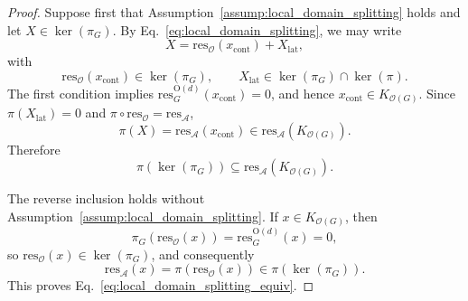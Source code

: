 \documentclass[aps,prx,reprint,superscriptaddress,twocolumn,amsmath,amssymb,amsfonts, nofootinbib]{revtex4-2}
\newcommand{\res}{\text{res}}
\theoremstyle{apsstyle}
\begin{document}
\begin{proof}
Suppose first that Assumption~\ref{assump:local_domain_splitting} holds and let
$X\in\ker(\pi_G)$. By Eq.~\ref{eq:local_domain_splitting}, we may write
\begin{equation*}
    X=\res_{\mathcal O}(x_{\mathrm{cont}})+X_{\mathrm{lat}},
\end{equation*}
with
\begin{equation*}
    \res_{\mathcal O}(x_{\mathrm{cont}})\in\ker(\pi_G),
    \qquad
    X_{\mathrm{lat}}\in\ker(\pi_G)\cap\ker(\pi).
\end{equation*}
The first condition implies $\res_G^{\mathrm{O}(d)}(x_{\mathrm{cont}})=0$, and hence $x_{\mathrm{cont}}\in K_{\mathcal O(G)}$. Since
$\pi(X_{\mathrm{lat}})=0$ and
$\pi\circ\res_{\mathcal O}=\res_{\mathcal A}$,
\begin{equation*}
    \pi(X)
    =
    \res_{\mathcal A}(x_{\mathrm{cont}})
    \in
    \res_{\mathcal A}(K_{\mathcal O(G)}).
\end{equation*}
Therefore
\begin{equation*}
    \pi(\ker(\pi_G))
    \subseteq
    \res_{\mathcal A}(K_{\mathcal O(G)}).
\end{equation*}

The reverse inclusion holds without Assumption~\ref{assump:local_domain_splitting}. If
$x\in K_{\mathcal O(G)}$, then
\begin{equation*}
    \pi_G(\res_{\mathcal O}(x))
    =
    \res_G^{\mathrm{O}(d)}(x)
    =
    0,
\end{equation*}
so $\res_{\mathcal O}(x)\in\ker(\pi_G)$, and consequently
\begin{equation*}
    \res_{\mathcal A}(x)
    =
    \pi(\res_{\mathcal O}(x))
    \in
    \pi(\ker(\pi_G)).
\end{equation*}
This proves Eq.~\ref{eq:local_domain_splitting_equiv}.


\end{proof}
\end{document}
